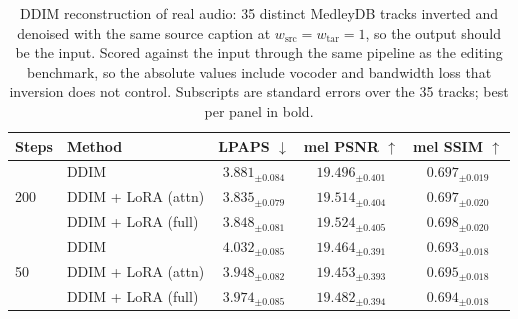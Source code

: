 \begin{table}[t]
  \centering
  \caption{DDIM reconstruction of real audio: 35 distinct MedleyDB tracks inverted and denoised
    with the same source caption at $w_{\mathrm{src}} = w_{\mathrm{tar}} = 1$, so the output
    should be the input. Scored against the input through the same pipeline as the editing
    benchmark, so the absolute values include vocoder and bandwidth loss that inversion does not
    control. Subscripts are standard errors over the 35 tracks; best per panel in bold.}
  \label{tab:medleydb-reconstruction}
  \begin{tabular}{ll ccc}
    \toprule
    Steps & Method & LPAPS $\downarrow$ & mel PSNR $\uparrow$ & mel SSIM $\uparrow$ \\
    \midrule
    \multirow{3}{*}{200}
      & DDIM                 & $3.881_{\pm 0.084}$ & $19.496_{\pm 0.401}$ & $0.697_{\pm 0.019}$ \\
      & DDIM + LoRA (attn)   & $\mathbf{3.835}_{\pm 0.079}$ & $19.514_{\pm 0.404}$ & $0.697_{\pm 0.020}$ \\
      & DDIM + LoRA (full)   & $3.848_{\pm 0.081}$ & $\mathbf{19.524}_{\pm 0.405}$ & $\mathbf{0.698}_{\pm 0.020}$ \\
    \midrule
    \multirow{3}{*}{50}
      & DDIM                 & $4.032_{\pm 0.085}$ & $19.464_{\pm 0.391}$ & $0.693_{\pm 0.018}$ \\
      & DDIM + LoRA (attn)   & $\mathbf{3.948}_{\pm 0.082}$ & $19.453_{\pm 0.393}$ & $\mathbf{0.695}_{\pm 0.018}$ \\
      & DDIM + LoRA (full)   & $3.974_{\pm 0.085}$ & $\mathbf{19.482}_{\pm 0.394}$ & $0.694_{\pm 0.018}$ \\
    \bottomrule
  \end{tabular}
\end{table}

